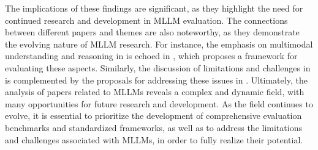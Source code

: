 \documentclass[conference]{IEEEtran}
\begin{document}
The implications of these findings are significant, as they highlight the need for continued research and development in MLLM evaluation. The connections between different papers and themes are also noteworthy, as they demonstrate the evolving nature of MLLM research. For instance, the emphasis on multimodal understanding and reasoning in \cite{b1} is echoed in \cite{b2}, which proposes a framework for evaluating these aspects. Similarly, the discussion of limitations and challenges in \cite{b5} is complemented by the proposals for addressing these issues in \cite{b8}. Ultimately, the analysis of papers related to MLLMs reveals a complex and dynamic field, with many opportunities for future research and development. As the field continues to evolve, it is essential to prioritize the development of comprehensive evaluation benchmarks and standardized frameworks, as well as to address the limitations and challenges associated with MLLMs, in order to fully realize their potential.
\end{document}
